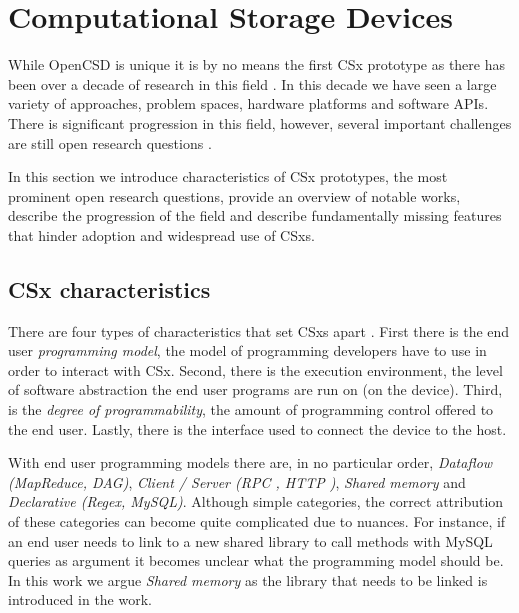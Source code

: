 \section{Computational Storage Devices}

While OpenCSD is unique it is by no means the first CSx prototype as there
has been over a decade of research in this field \cite{lukken2021past}. In this
decade we have seen a large variety of approaches, problem spaces, hardware
platforms and software APIs. There is significant progression in this field, 
however, several important challenges are still open research
questions \cite{barbalacecomputational}.

In this section we introduce characteristics of CSx prototypes, the most
prominent open research questions, provide an overview of notable works,
describe the progression of the field and describe fundamentally missing
features that hinder adoption and widespread use of CSxs.





\subsection{CSx characteristics}

There are four types of characteristics that set CSxs apart
\cite{lukken2021past}. First there is the end user \textit{programming model},
the model of programming developers have to use in order to interact with CSx.
Second, there is the execution environment, the level of software abstraction
the end user programs are run on (on the device). Third, is the
\textit{degree of programmability}, the amount of programming control offered to
the end user. Lastly, there is the interface used to connect the device to the
host.

With end user programming models there are, in no particular order,
\textit{Dataflow (MapReduce, DAG)}, \textit{Client / Server
(RPC \footnotemark[1], HTTP \footnotemark[2])}, \textit{Shared memory} and
\textit{Declarative (Regex, MySQL)}. Although simple categories, the correct
attribution of these categories can become quite complicated due to nuances. For
instance, if an end user needs to link to a new shared library to call methods
with MySQL queries as argument it becomes unclear what the programming model
should be. In this work we argue \textit{Shared memory} as the library that
needs to be linked is introduced in the work.

